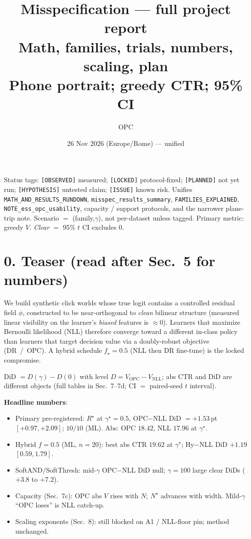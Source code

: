 \documentclass[11pt]{article}
\title{\textbf{Misspecification --- full project report}\\[0.2em]
\large Math, families, trials, numbers, scaling, plan\\[0.15em]
\normalsize Phone portrait; greedy CTR; 95\% CI}
\author{OPC}
\date{26 Nov 2026 (Europe/Rome) --- unified}
\newcommand{\phonesection}[1]{\Needspace{8\baselineskip}\section*{#1}}
\newcommand{\stag}[1]{\texttt{[#1]}}
\newcommand{\Rstar}{R^{\star}}
\begin{document}
\maketitle

{\footnotesize\raggedright
Status tags: \stag{OBSERVED} measured;
\stag{LOCKED} protocol-fixed;
\stag{PLANNED} not yet run;
\stag{HYPOTHESIS} untested claim;
\stag{ISSUE} known risk.
Unifies \texttt{MATH\_AND\_RESULTS\_RUNDOWN},
\texttt{misspec\_results\_summary},
\texttt{FAMILIES\_EXPLAINED},
\texttt{NOTE\_ess\_opc\_usability},
capacity / support protocols, and the
narrower plane-trip note. Scenario $=$
(family,$\gamma$), not per-dataset unless
tagged. Primary metric: greedy $V$.
\emph{Clear} $=$ 95\% $t$ CI excludes 0.\par
}

\phonesection{0. Teaser (read after Sec.~5 for numbers)}

We build synthetic click worlds whose true logit
contains a controlled residual field $\phi$,
constructed to be near-orthogonal to
\emph{clean} bilinear structure (measured
linear visibility on the learner's
\emph{biased} features is $\approx 0$).
Learners that maximize Bernoulli likelihood
(NLL) therefore converge toward a different
in-class policy than learners that target
decision value via a doubly-robust objective
(DR~/~OPC).  A hybrid schedule
$f_{\star}{=}0.5$ (NLL then DR fine-tune) is
the locked compromise.

DiD $=D(\gamma)-D(0)$ with level
$D=V_{\mathrm{OPC}}-V_{\mathrm{NLL}}$;
abs CTR and DiD are different objects
(full tables in Sec.~7--7d; CI $=$ paired-seed
$t$ interval).

\textbf{Headline numbers}:
\begin{itemize}
  \item Primary pre-registered:
        $\Rstar$ at $\gamma^{\star}{=}0.5$,
        OPC$-$NLL DiD
        $=+1.53$\,pt $[+0.97,+2.09]$;
        $10/10$ (ML). Abs: OPC $18.42$,
        NLL $17.96$ at $\gamma^{\star}$.
  \item Hybrid $f{=}0.5$ (ML, $n{=}20$):
        best abs CTR $19.62$ at $\gamma^{\star}$;
        Hy$-$NLL DiD $+1.19$ $[0.59,1.79]$.
  \item SoftAND/SoftThresh: mid-$\gamma$
        OPC$-$NLL DiD null; $\gamma{=}100$
        large clear DiDs ($+3.8$ to $+7.2$).
  \item Capacity (Sec.~7c): OPC abs $V$
        rises with $N$; $N^{\star}$ advances
        with width. Mild-$\gamma$ ``OPC loses''
        is NLL catch-up.
  \item Scaling exponents (Sec.~8): still
        blocked on A1 / NLL-floor pin; method
        unchanged.
\end{itemize}
\end{document}
